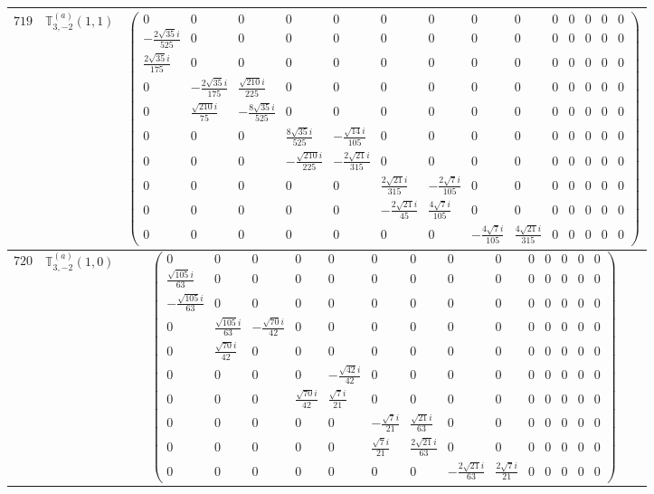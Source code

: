 \documentclass[fleqn,8pt,landscape]{jsarticle}
\begin{document}
\begin{center}
\begin{longtable}{ccc}
$ 719 $ & $ \mathbb{T}_{3,-2}^{(a)}(1,1) $ & $ \begin{pmatrix} 0 & 0 & 0 & 0 & 0 & 0 & 0 & 0 & 0 & 0 & 0 & 0 & 0 & 0 \\ - \frac{2 \sqrt{35} i}{525} & 0 & 0 & 0 & 0 & 0 & 0 & 0 & 0 & 0 & 0 & 0 & 0 & 0 \\ \frac{2 \sqrt{35} i}{175} & 0 & 0 & 0 & 0 & 0 & 0 & 0 & 0 & 0 & 0 & 0 & 0 & 0 \\ 0 & - \frac{2 \sqrt{35} i}{175} & \frac{\sqrt{210} i}{225} & 0 & 0 & 0 & 0 & 0 & 0 & 0 & 0 & 0 & 0 & 0 \\ 0 & \frac{\sqrt{210} i}{75} & - \frac{8 \sqrt{35} i}{525} & 0 & 0 & 0 & 0 & 0 & 0 & 0 & 0 & 0 & 0 & 0 \\ 0 & 0 & 0 & \frac{8 \sqrt{35} i}{525} & - \frac{\sqrt{14} i}{105} & 0 & 0 & 0 & 0 & 0 & 0 & 0 & 0 & 0 \\ 0 & 0 & 0 & - \frac{\sqrt{210} i}{225} & - \frac{2 \sqrt{21} i}{315} & 0 & 0 & 0 & 0 & 0 & 0 & 0 & 0 & 0 \\ 0 & 0 & 0 & 0 & 0 & \frac{2 \sqrt{21} i}{315} & - \frac{2 \sqrt{7} i}{105} & 0 & 0 & 0 & 0 & 0 & 0 & 0 \\ 0 & 0 & 0 & 0 & 0 & - \frac{2 \sqrt{21} i}{45} & \frac{4 \sqrt{7} i}{105} & 0 & 0 & 0 & 0 & 0 & 0 & 0 \\ 0 & 0 & 0 & 0 & 0 & 0 & 0 & - \frac{4 \sqrt{7} i}{105} & \frac{4 \sqrt{21} i}{315} & 0 & 0 & 0 & 0 & 0 \end{pmatrix} $ \\ \hline
$ 720 $ & $ \mathbb{T}_{3,-2}^{(a)}(1,0) $ & $ \begin{pmatrix} 0 & 0 & 0 & 0 & 0 & 0 & 0 & 0 & 0 & 0 & 0 & 0 & 0 & 0 \\ \frac{\sqrt{105} i}{63} & 0 & 0 & 0 & 0 & 0 & 0 & 0 & 0 & 0 & 0 & 0 & 0 & 0 \\ - \frac{\sqrt{105} i}{63} & 0 & 0 & 0 & 0 & 0 & 0 & 0 & 0 & 0 & 0 & 0 & 0 & 0 \\ 0 & \frac{\sqrt{105} i}{63} & - \frac{\sqrt{70} i}{42} & 0 & 0 & 0 & 0 & 0 & 0 & 0 & 0 & 0 & 0 & 0 \\ 0 & \frac{\sqrt{70} i}{42} & 0 & 0 & 0 & 0 & 0 & 0 & 0 & 0 & 0 & 0 & 0 & 0 \\ 0 & 0 & 0 & 0 & - \frac{\sqrt{42} i}{42} & 0 & 0 & 0 & 0 & 0 & 0 & 0 & 0 & 0 \\ 0 & 0 & 0 & \frac{\sqrt{70} i}{42} & \frac{\sqrt{7} i}{21} & 0 & 0 & 0 & 0 & 0 & 0 & 0 & 0 & 0 \\ 0 & 0 & 0 & 0 & 0 & - \frac{\sqrt{7} i}{21} & \frac{\sqrt{21} i}{63} & 0 & 0 & 0 & 0 & 0 & 0 & 0 \\ 0 & 0 & 0 & 0 & 0 & \frac{\sqrt{7} i}{21} & \frac{2 \sqrt{21} i}{63} & 0 & 0 & 0 & 0 & 0 & 0 & 0 \\ 0 & 0 & 0 & 0 & 0 & 0 & 0 & - \frac{2 \sqrt{21} i}{63} & \frac{2 \sqrt{7} i}{21} & 0 & 0 & 0 & 0 & 0 \end{pmatrix} $ \\ \hline

\end{longtable}
\end{center}
\end{document}
